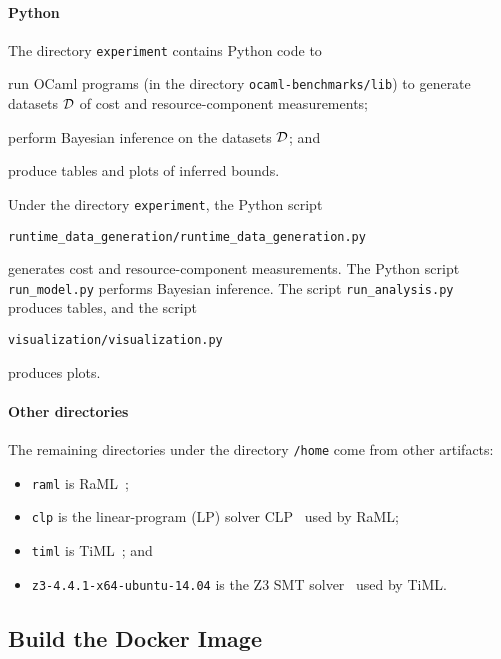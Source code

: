 \paragraph{Python}

The directory \texttt{experiment} contains Python code to
\begin{enumerate*}[label=(\roman*)]
  \item run OCaml programs (in the directory \texttt{ocaml-benchmarks/lib})
        to generate datasets $\mathcal{D}$ of cost and resource-component measurements;
  \item perform Bayesian inference on the datasets $\mathcal{D}$; and
  \item produce tables and plots of inferred bounds.
\end{enumerate*}
%
Under the directory \texttt{experiment}, the Python script
\begin{verbatim}
runtime_data_generation/runtime_data_generation.py
\end{verbatim}
generates cost and resource-component measurements.
%
The Python script \texttt{run\_model.py} performs Bayesian inference.
%
The script \texttt{run\_analysis.py} produces tables, and the script
\begin{verbatim}
visualization/visualization.py
\end{verbatim}
produces plots.

\paragraph{Other directories}

The remaining directories under the directory \texttt{/home} come from other
artifacts:
\begin{itemize}
  \item \texttt{raml} is RaML~\citep{Hoffmann2017,RaML};
  \item \texttt{clp} is the linear-program (LP) solver CLP~\citep{CLP} used by
        RaML;
  \item \texttt{timl} is TiML~\citep{WangWC17}; and
  \item \texttt{z3-4.4.1-x64-ubuntu-14.04} is the Z3 SMT
        solver~\citep{DeMoura2008} used by TiML.
\end{itemize}

\subsection{Build the Docker Image}

